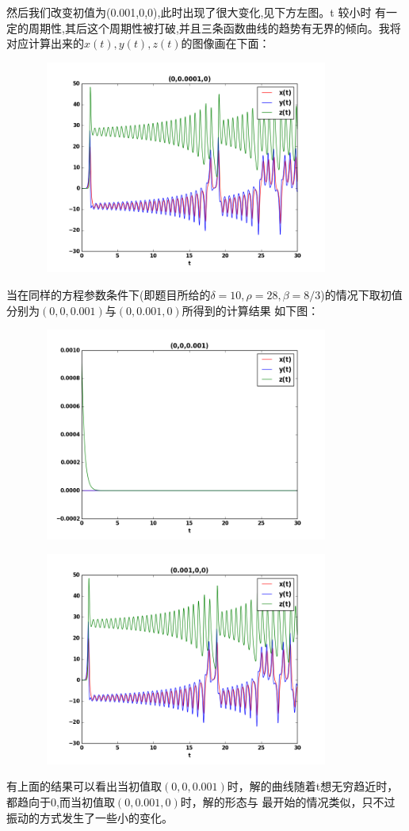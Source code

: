 \documentclass[10pt,a4paper]{ctexart}
\begin{document}
然后我们改变初值为(0.001,0,0),此时出现了很大变化,见下方左图。t 较小时
有一定的周期性,其后这个周期性被打破,并且三条函数曲线的趋势有无界的倾向。我将对应计算出来的$x(t),y(t),z(t)$的图像画在下面：
\par
\centerline{\includegraphics[height=7cm,width=12cm]{lorenz2d1.png}}
\par
当在同样的方程参数条件下(即题目所给的$\delta=10,\rho=28,\beta=8/3$)的情况下取初值分别为$(0,0,0.001)$与$(0,0.001,0)$所得到的计算结果
如下图：
\par
\centerline{\includegraphics[height=7cm,width=12cm]{lorenz2d2.png}}
\par
\par
\centerline{\includegraphics[height=7cm,width=12cm]{lorenz2d3.png}}
\par
有上面的结果可以看出当初值取$(0,0,0.001)$时，解的曲线随着t想无穷趋近时，都趋向于0,而当初值取$(0,0.001,0)$时，解的形态与
最开始的情况类似，只不过振动的方式发生了一些小的变化。
\end{document}
